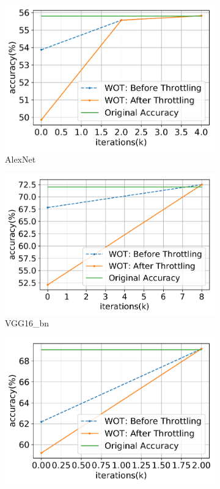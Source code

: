 \documentclass{article}
\begin{document}
\begin{figure}[t]
  \centering
  \begin{subfigure}{.32\textwidth}
    \includegraphics[width=\textwidth]{NeuRIPS2019/images/WOT_new/alexnet_accuracy.pdf}
    \caption{AlexNet}
    \end{subfigure}
      \begin{subfigure}{.32\textwidth}
    \includegraphics[width=\textwidth]{NeuRIPS2019/images/WOT_new/vgg16_bn_accuracy.pdf}
    \caption{VGG16\_bn}
    \end{subfigure}
\begin{subfigure}{.32\textwidth}
    \includegraphics[width=\textwidth]{NeuRIPS2019/images/WOT_new/resnet18_accuracy.pdf}

\end{subfigure}
\end{figure}
\end{document}
